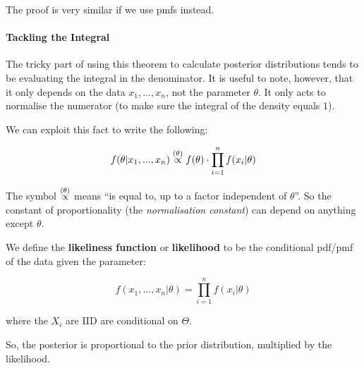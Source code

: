\documentclass[a4paper]{article}
\begin{document}
                    The proof is very similar if we use pmfs instead.

                \paragraph{Tackling the Integral}
                    The tricky part of using this theorem to calculate posterior
                    distributions tends to be evaluating the integral in the
                    denominator. It is useful to note, however, that it only
                    depends on the data $x_1, ..., x_n$, not the parameter
                    $\theta$. It only acts to normalise the numerator (to make
                    sure the integral of the density equals $1$).

                    We can exploit this fact to write the following:

                    \[
                        f(\theta | x_1, ..., x_n) \stackrel{({\theta})}{\propto}
                        f(\theta) \cdot \prod_{i=1}^n f(x_i | \theta)
                    \]

                    \begin{warn}
                        The symbol $\stackrel{({\theta})}{\propto}$ means ``is equal to, up to
                        a factor independent of $\theta$''. So the constant of
                        proportionality (the \textit{normalisation constant})
                        can depend on anything
                        except $\theta$.
                    \end{warn}

                    \begin{definition}
                        We define the \textbf{likeliness function} or
                        \textbf{likelihood} to be the conditional pdf/pmf of
                        the data given the parameter:

                        \[
                            f(x_1, ..., x_n | \theta) = \prod_{i=1}^n f(x_i |
                            \theta)
                        \]

                        where the $X_i$ are IID are conditional on $\Theta$.

                        So, the posterior is proportional to the prior
                        distribution, multiplied by the likelihood.
                    \end{definition}
\end{document}
